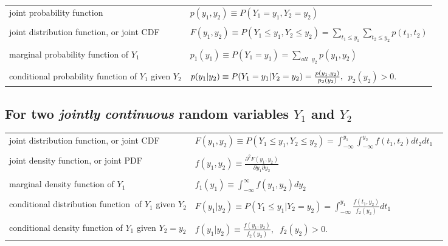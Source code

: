 \documentclass[11pt]{article}
\begin{document}
\begin{tabular}{ll}
joint probability function & $p(y_{1},y_{2})\equiv
P(Y_{1}=y_{1},Y_{2}=y_{2}) $ \\ 
&  \\ 
joint distribution function, or joint CDF & $F(y_{1},y_{2})\equiv
P(Y_{1}\leq y_{1},Y_{2}\leq y_{2})=\sum_{t_{1}\leq y_{1}}\sum_{t_{2}\leq
y_{2}}p(t_{1},t_{2})$ \\ 
&  \\ 
marginal probability function of $Y_{1}$ & $p_{1}(y_{1})\equiv
P(Y_{1}=y_{1})=\sum_{all\text{ }y_{2}}p(y_{1},y_{2})$ \\ 
&  \\ 
conditional probability function of $Y_{1}$ given $Y_{2}$ & $%
p(y_{1}|y_{2})\equiv P(Y_{1}=y_{1}|Y_{2}=y_{2})=\frac{p(y_{1},y_{2})}{%
p_{2}(y_{2})},$ $\ p_{2}(y_{2})>0.$%
\end{tabular}%
\bigskip

\subsection{For two \textit{jointly} \textit{continuous} random variables $%
Y_{1}$ and $Y_{2}$\protect\bigskip}

\begin{tabular}{ll}
joint distribution function, or joint CDF & $F(y_{1},y_{2})\equiv
P(Y_{1}\leq y_{1},Y_{2}\leq y_{2})=\int_{-\infty }^{y_{1}}\int_{-\infty
}^{y_{2}}f(t_{1},t_{2})dt_{2}dt_{1}\text{ }$ \\ 
&  \\ 
joint density function, or joint PDF & $f(y_{1},y_{2})\equiv \frac{\partial
^{2}F(y_{1},y_{2})}{\partial y_{1}\partial y_{2}}$ \\ 
&  \\ 
marginal density function of $Y_{1}$ & $f_{1}(y_{1})\equiv \int_{-\infty
}^{\infty }f(y_{1},y_{2})dy_{2}$ \\ 
&  \\ 
conditional distribution function\textbf{\ }of $Y_{1}$ given $Y_{2}$ & $%
F(y_{1}|y_{2})\equiv P(Y_{1}\leq y_{1}|Y_{2}=y_{2})=\int_{-\infty }^{y_{1}}%
\frac{f(t_{1},y_{2})}{f_{2}(y_{2})}dt_{1}$ \\ 
&  \\ 
conditional density function of $Y_{1}$ given $Y_{2}=y_{2}$ & $%
f(y_{1}|y_{2})\equiv \frac{f(y_{1},y_{2})}{f_{2}(y_{2})},$ $\
f_{2}(y_{2})>0. $%
\end{tabular}
\end{document}
